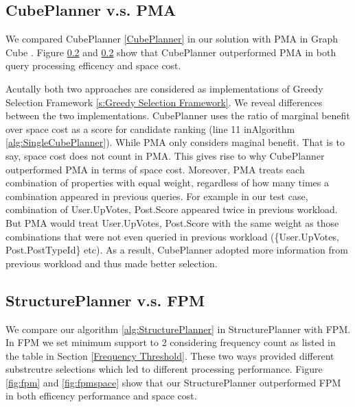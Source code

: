 \subsection{CubePlanner v.s. PMA}
We compared CubePlanner \ref{CubePlanner} in our solution with PMA in Graph Cube \cite{DBLP:conf/sigmod/ZhaoLXH11}. Figure \ref{} and \ref{} show that CubePlanner outperformed PMA in both query processing efficency and space cost. 

Acutally both two approaches are considered as implementations of Greedy Selection Framework \ref{s:Greedy Selection Framework}. We reveal differences between the two implementations. CubePlanner uses the ratio of marginal benefit over space cost as a score for candidate ranking (line 11 inAlgorithm \ref{alg:SingleCubePlanner}). While PMA only considers maginal benefit. That is to say, space cost does not count in PMA. This gives rise to why CubePlanner outperformed PMA in terms of space cost. Moreover, PMA treats each combination of properties with equal weight, regardless of how many times a combination appeared in previous queries. For example in our test case, combination of {User.UpVotes, Post.Score} appeared twice in previous workload. But PMA would treat {User.UpVotes, Post.Score} with the same weight as those combinations that were not even queried in previous workload (\{User.UpVotes, Post.PostTypeId\} etc). As a result, CubePlanner adopted more information from previous workload and thus made better selection. 

\subsection{StructurePlanner v.s. FPM}
We compare our algorithm \ref{alg:StructurePlanner} in StructurePlanner with FPM. In FPM we set minimum support to 2 considering frequency count as listed in the table in Section \ref{Frequency Threshold}. These two ways provided different substrcutre selections which led to different processing performance. Figure \ref{fig:fpm} and \ref{fig:fpmspace} show that our StructurePlanner outperformed FPM in both efficency performance and space cost.

